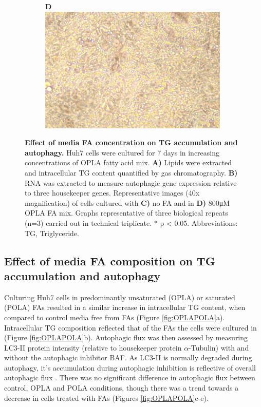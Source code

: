 \begin{figure}[h!]
\begin{subfigure}[b]{0.49\textwidth}
     \end{subfigure}
     \hfill
      \begin{subfigure}[b]{0.49\textwidth}
         \textbf{D}
         \centering
         \includegraphics[width=\textwidth]{figures/ch3-Model Development/OPLA 800uM Picture.png}
     \end{subfigure}
     \hfill
        \caption{\textbf{Effect of media FA concentration on TG accumulation and autophagy.} Huh7 cells were cultured for 7 days in increasing concentrations of OPLA fatty acid mix. \textbf{A)} Lipids were extracted and intracellular TG content quantified by gas chromatography. \textbf{B)} RNA was extracted to measure autophagic gene expression relative to three housekeeper genes. Representative images (40x magnification) of cells cultured with \textbf{C)} no FA and in \textbf{D)} 800μM OPLA FA mix. Graphs representative of three biological repeats (n=3) carried out in technical triplicate. * p < 0.05. Abbreviations: TG, Triglyceride.}
        \label{fig:ch3-Model Development LFHF}
\end{figure}

\subsection{Effect of media FA composition on TG accumulation and autophagy}

Culturing Huh7 cells in predominantly unsaturated (OPLA) or saturated (POLA) FAs resulted in a similar increase in intracellular TG content, when compared to control media free from FAs (Figure \ref{fig:OPLAPOLA}a). Intracellular TG composition reflected that of the FAs the cells were cultured in (Figure \ref{fig:OPLAPOLA}b). Autophagic flux was then assessed by measuring LC3-II protein intensity (relative to housekeeper protein $\alpha$-Tubulin) with and without the autophagic inhibitor BAF. As LC3-II is normally degraded during autophagy, it's accumulation during autophagic inhibition is reflective of overall autophagic flux \cite{DJ2021Guidelines1}. There was no significant difference in autophagic flux between control, OPLA and POLA conditions, though there was a trend towards a decrease in cells treated with FAs (Figures \ref{fig:OPLAPOLA}c-e).


